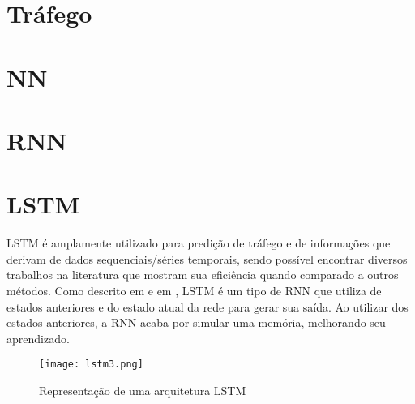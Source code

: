 
\section{Tráfego}


\section{\acrfull{NN}}


\section{\acrfull{RNN}}






\section{\acrfull{LSTM}}

\acrshort{LSTM} é amplamente utilizado para predição de tráfego e de informações que derivam de dados sequenciais/séries temporais, sendo possível encontrar diversos trabalhos na literatura que mostram sua eficiência quando comparado a outros métodos. Como descrito em \cite{Zainab_2018} e em \cite{Xiaolei_2015}, \acrshort{LSTM} é um tipo de \acrfull{RNN} que utiliza de estados anteriores e do estado atual da rede para gerar sua saída. Ao utilizar dos estados anteriores, a \acrshort{RNN} acaba por simular uma memória, melhorando seu aprendizado. 

\begin{figure}[htb]
    \centering
    \texttt{[image: lstm3.png]}
    \label{figure:eixo}
    \caption[Representação de uma arquitetura LSTM]{Representação de uma arquitetura LSTM\footnotemark}
\end{figure}

